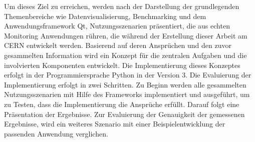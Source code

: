 Um dieses Ziel zu erreichen, werden nach der Darstellung der grundlegenden
Themenbereiche wie Datenvisualisierung, Benchmarking und dem Anwendungsframework
Qt, Nutzungsszenarien präsentiert, die aus echten Monitoring Anwendungen 
rühren, die während der Erstellung dieser Arbeit am CERN entwickelt werden.
Basierend auf deren Ansprüchen und den zuvor gesammelten Information wird ein
Konzept für die zentralen Aufgaben und die involvierten Komponenten entwickelt.
Die Implementierung dieses Konzeptes erfolgt in der Programmiersprache Python
in der Version 3. Die Evaluierung der Implementierung erfolgt in zwei Schritten.
Zu Beginn werden alle gesammelten Nutzungsszenarien mit Hilfe des Frameworks
implementiert und ausgeführt, um zu Testen, dass die Implementierung die
Ansprüche erfüllt. Darauf folgt eine Präsentation der Ergebnisse. Zur
Evaluierung der Genauigkeit der gemessenen Ergebnisse, wird ein weiteres
Szenario mit einer Beispielentwicklung der passenden Anwendung verglichen.
